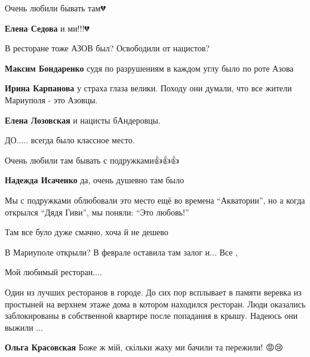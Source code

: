 Очень любили бывать там💔

\textbf{Елена Седова} и ми!!!💔


В ресторане тоже АЗОВ был? Освободили от нацистов?

\begin{itemize} %
\textbf{Максим Бондаренко} судя по разрушениям в каждом углу было по роте Азова

\textbf{Ирина Карпанова} у страха глаза велики. Походу они думали, что все жители Мариуполя - это Азовцы.

\textbf{Елена Лозовская} и нацисты бАндеровцы.
\end{itemize} %


ДО..... всегда было классное место.

Очень любили там бывать с подружками👍👍👍

\begin{itemize} %
\textbf{Надежда Исаченко} да, очень душевно там было
\end{itemize} %


Мы с подружками облюбовали это место ещё во времена \enquote{Акватории}, но а
когда открылся \enquote{Дядя Гиви}, мы поняли: \enquote{Это любовь!}


Там все було дуже смачно, хоча й не дешево


В Мариуполе открыли? В феврале оставила там залог и... Все ,


Мой любимый ресторан....


Один из лучших ресторанов в городе. До сих пор всплывает в памяти веревка из
простыней на верхнем этаже дома в котором находился ресторан. Люди оказались
заблокированы в собственной квартире после попадания в крышу. Надеюсь они выжили
...

\begin{itemize} %
\textbf{Ольга Красовская} Боже ж мій, скільки жаху ми бачили та пережили! 😡😢
\end{itemize} %
